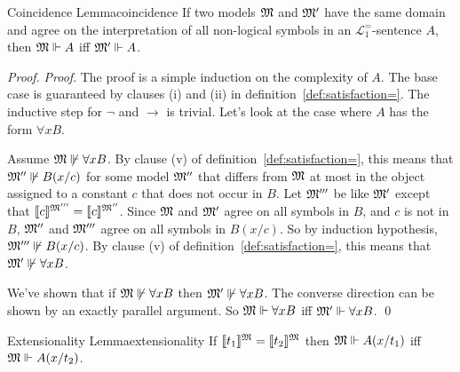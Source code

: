 \begin{lemma}{Coincidence Lemma}{coincidence}
  If two models $\mathfrak{M}$ and $\mathfrak{M}'$
  have the same domain and
  agree on the interpretation of all non-logical symbols in an $\mathcal L_1^=$-sentence $A$, then
  $\mathfrak{M}\Vdash A$ iff $\mathfrak{M}'\Vdash A$.
\end{lemma}
\begin{proof}
  \emph{Proof}.
  The proof is a simple induction on the complexity of $A$.
  The base case is guaranteed by clauses (i) and (ii) in definition~\ref{def:satisfaction=}.
  The inductive step for $\neg$ and $\to$ is trivial.
  Let's look at the case where $A$ has the form $\forall x B$.

  Assume $\mathfrak{M} \not\Vdash \forall x B$.
  By clause (v) of definition~\ref{def:satisfaction=},
  this means that
  $\mathfrak{M}'' \not\Vdash B(x/c)$ for some model $\mathfrak{M}''$
  that differs from $\mathfrak{M}$ at most in the object assigned to a constant $c$
  that does not occur in $B$.
  Let $\mathfrak{M}'''$ be like $\mathfrak{M}'$ except that
  $\llbracket c \rrbracket^{\mathfrak{M}'''} = \llbracket c \rrbracket^{\mathfrak{M}''}$.
  Since $\mathfrak{M}$ and $\mathfrak{M}'$ agree on all symbols in $B$,
  and $c$ is not in $B$,
  $\mathfrak{M}''$ and $\mathfrak{M}'''$ agree on all symbols in $B(x/c)$.
  So by induction hypothesis,
  $\mathfrak{M}''' \not\Vdash B(x/c)$.
  By clause (v) of definition~\ref{def:satisfaction=},
  this means that $\mathfrak{M}' \not\Vdash \forall x B$.

  We've shown that if $\mathfrak{M} \not\Vdash \forall x B$ then $\mathfrak{M}' \not\Vdash \forall x B$.
  The converse direction can be shown by an exactly parallel argument.
  So $\mathfrak{M} \Vdash \forall x B$ iff $\mathfrak{M}' \Vdash \forall x B$.
  \qed
\end{proof}

\begin{lemma}{Extensionality Lemma}{extensionality}
  If $\llbracket t_1 \rrbracket^{\mathfrak{M}} = \llbracket t_2 \rrbracket^{\mathfrak{M}}$
  then $\mathfrak{M} \Vdash A(x/t_1)$ iff $\mathfrak{M} \Vdash A(x/t_2)$.
\end{lemma}

